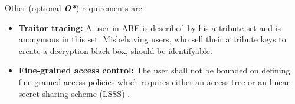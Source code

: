 \noindent Other (optional \textbf{\textit{O*}}) requirements are: 
\begin{itemize}
	\item[\req{O1}] \textbf{Traitor tracing:} A user in \ac{ABE} is described by his attribute set and is anonymous in this set. Misbehaving users, who sell their attribute keys to create a decryption black box, should be identifyable. \cite{liu2016practical}
	\item[\req{O2}] \textbf{Fine-grained access control:} The user shall not be bounded on defining fine-grained access policies which requires either an access tree \cite{bethencourt2007ciphertext} or an linear secret sharing scheme (\ac{LSSS}) \cite{yang2013dac} \cite{li2016secure} \cite{wu2017security} \cite{li2013matrix} \cite{liu2016practical}.
\end{itemize}